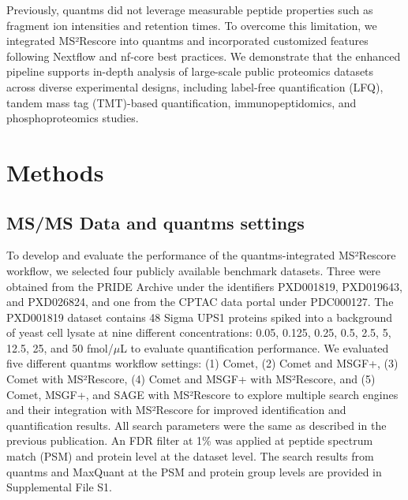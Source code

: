\documentclass[12pt]{article}
\begin{document}
Previously, quantms did not leverage measurable peptide properties such as fragment ion intensities and retention times. To overcome this limitation, we integrated MS²Rescore into quantms and incorporated customized features following Nextflow and nf-core best practices. %
We demonstrate that the enhanced pipeline supports in-depth analysis of large-scale public proteomics datasets across diverse experimental designs, including label-free quantification (LFQ), tandem mass tag (TMT)-based quantification, immunopeptidomics, and phosphoproteomics studies.

\section{Methods}

\subsection{MS/MS Data and quantms settings}
To develop and evaluate the performance of the quantms-integrated MS²Rescore workflow, we selected four publicly available benchmark datasets. Three were obtained from the PRIDE Archive under the identifiers PXD001819, PXD019643, and PXD026824, and one from the CPTAC data portal under PDC000127. %
The PXD001819 dataset contains 48 Sigma UPS1 proteins spiked into a background of yeast cell lysate at nine different concentrations: 0.05, 0.125, 0.25, 0.5, 2.5, 5, 12.5, 25, and 50 fmol/$\mu$L to evaluate quantification performance. %
We evaluated five different quantms workflow settings: (1) Comet, (2) Comet and MSGF+, (3) Comet with MS²Rescore, (4) Comet and MSGF+ with MS²Rescore, and (5) Comet, MSGF+, and SAGE with MS²Rescore to explore multiple search engines and their integration with MS²Rescore for improved identification and quantification results. All search parameters were the same as described in the previous publication. An FDR filter at 1\% was applied at peptide spectrum match (PSM) and protein level at the dataset level. %
The search results from quantms and MaxQuant at the PSM and protein group levels are provided in Supplemental File S1.
\end{document}
